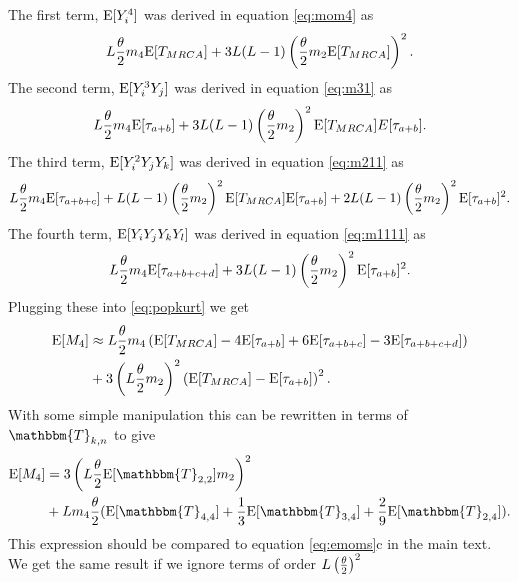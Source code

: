 The first term, $\mathrm{E}[Y_i^4]$ was derived in equation \eqref{eq:mom4} as
\begin{equation*}
  L\frac{\theta}{2} m_4 \mathrm{E}[T_{MRCA}] + 3L(L-1)\left( \frac{\theta}{2} m_2 \mathrm{E}[T_{MRCA}] \right)^2.
\end{equation*}
The second term, $\mathrm{E}[Y_i^3Y_j]$ was derived in equation \eqref{eq:m31} as
\begin{equation*}
  L \frac{\theta}{2} m_4 \mathrm{E}[\tau_{a+b}] + 3L(L-1) \left(\frac{\theta}{2} m_2\right)^2 \mathrm{E}[T_{MRCA}]\\E[\tau_{a+b}].
\end{equation*}
The third term, $\mathrm{E}[Y_i^2Y_jY_k]$ was derived in equation \eqref{eq:m211} as
\begin{equation*}
  L \frac{\theta}{2} m_4 \mathrm{E}[\tau_{a+b+c}] + L(L-1)\left(\frac{\theta}{2} m_2\right)^2\mathrm{E}[T_{MRCA}]\mathrm{E}[\tau_{a+b}] +
  2L(L-1) \left(\frac{\theta}{2} m_2\right)^2\mathrm{E}[\tau_{a+b}]^2.
\end{equation*}
The fourth term, $\mathrm{E}[Y_iY_jY_kY_l]$ was derived in equation \eqref{eq:m1111} as
\begin{equation*}
  L \frac{\theta}{2} m_4 \mathrm{E}[\tau_{a+b+c+d}] + 3L(L-1)\left(\frac{\theta}{2} m_2\right)^2\mathrm{E}[\tau_{a+b}]^2.
\end{equation*}
Plugging these into \eqref{eq:popkurt} we get
\begin{align}
  \label{eq:popm4coal}
  \mathrm{E}[M_4] &\approx L \frac{\theta}{2} m_4 \left( \mathrm{E}[T_{MRCA}] - 4\mathrm{E}[\tau_{a+b}] + 6\mathrm{E}[\tau_{a+b+c}] -3\mathrm{E}[\tau_{a+b+c+d}] \right)\nonumber \\
  &+ 3\left( L \frac{\theta}{2} m_2 \right)^2\left(\mathrm{E}[T_{MRCA}]- \mathrm{E}[\tau_{a+b}]\right)^2.
\end{align}
With some simple manipulation this can be rewritten in terms of
$\mathbbm{T}_{k,n}$ to give
\begin{align}
  \E[M_4] &= 3\left(L \T \E[\mathbbm{T}_{2,2}] m_2\right)^2 \nonumber \\
  &+ L m_4 \T ( \E[\mathbbm{T}_{4,4}] + \frac{1}{3} \E[\mathbbm{T}_{3,4}] +
    \frac{2}{9} \E[\mathbbm{T}_{2,4}] ).
\end{align}
This expression should be compared to equation \eqref{eq:emoms}c in the main
text. We get the same result if we ignore terms of order $L \left( \frac{\theta}{2} \right)^2$
